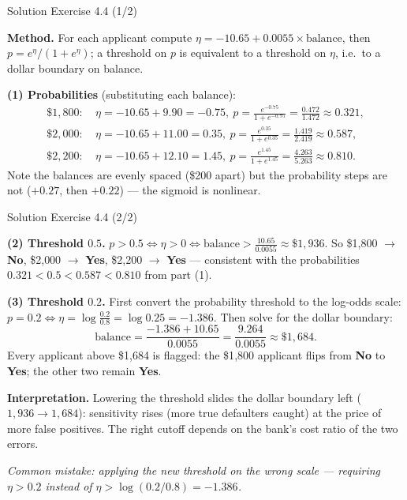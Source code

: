 \documentclass[aspectratio=169,11pt]{beamer}
\begin{document}
\begin{frame}{Solution \textemdash{} Exercise 4.4 (1/2)}
\begin{solutionbox}
\textbf{Method.} For each applicant compute
$\eta=-10.65+0.0055\times\text{balance}$, then
$p=e^{\eta}/(1+e^{\eta})$; a threshold on $p$ is equivalent to a
threshold on $\eta$, i.e.\ to a dollar boundary on balance.

\vspace{1mm}
\textbf{(1) Probabilities} (substituting each balance):
\[
\begin{aligned}
  \$1{,}800:&\ \eta=-10.65+9.90=-0.75,\ p=\tfrac{e^{-0.75}}{1+e^{-0.75}}
              =\tfrac{0.472}{1.472}\approx 0.321,\\
  \$2{,}000:&\ \eta=-10.65+11.00=0.35,\ p=\tfrac{e^{0.35}}{1+e^{0.35}}
              =\tfrac{1.419}{2.419}\approx 0.587,\\
  \$2{,}200:&\ \eta=-10.65+12.10=1.45,\ p=\tfrac{e^{1.45}}{1+e^{1.45}}
              =\tfrac{4.263}{5.263}\approx 0.810.
\end{aligned}
\]
Note the balances are evenly spaced (\$200 apart) but the probability
steps are not ($+0.27$, then $+0.22$) --- the sigmoid is nonlinear.
\end{solutionbox}
\end{frame}

\begin{frame}{Solution \textemdash{} Exercise 4.4 (2/2)}
\begin{solutionbox}
\textbf{(2) Threshold $0.5$.}
$p>0.5 \iff \eta>0 \iff \text{balance} > \tfrac{10.65}{0.0055}
\approx \$1{,}936$. So
\$1{,}800 $\to$ \textbf{No}, \$2{,}000 $\to$ \textbf{Yes},
\$2{,}200 $\to$ \textbf{Yes} --- consistent with the probabilities
$0.321 < 0.5 < 0.587 < 0.810$ from part (1).

\vspace{1mm}
\textbf{(3) Threshold $0.2$.}
First convert the probability threshold to the log-odds scale:
$p=0.2 \iff \eta=\log\!\frac{0.2}{0.8}=\log 0.25 = -1.386$. Then solve
for the dollar boundary:
\[
  \text{balance} = \frac{-1.386 + 10.65}{0.0055}
                 = \frac{9.264}{0.0055} \approx \$1{,}684 .
\]
Every applicant above \$1{,}684 is flagged: the \$1{,}800 applicant
flips from \textbf{No} to \textbf{Yes}; the other two remain
\textbf{Yes}.

\vspace{1mm}
\textbf{Interpretation.} Lowering the threshold slides the dollar
boundary left ($1{,}936\to1{,}684$): sensitivity rises (more true
defaulters caught) at the price of more false positives. The right
cutoff depends on the bank's cost ratio of the two errors.

\vspace{1mm}
\emph{Common mistake: applying the new threshold on the wrong scale ---
requiring $\eta>0.2$ instead of $\eta>\log(0.2/0.8)=-1.386$.}
\end{solutionbox}
\end{frame}
\end{document}
